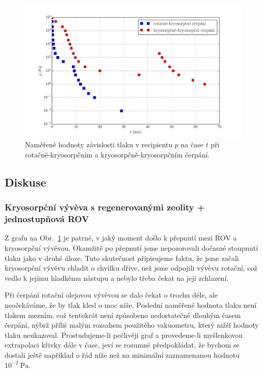 \documentclass[english]{article}
\newcommand{\unit}[1]{~\mathrm{#1}}
\begin{document}
	\begin{figure}[h!]
		\begin{center}
			\includegraphics[width=\linewidth]{../plt/01_kryorot.pdf}
			\vspace*{-0,7cm}
			\caption{Naměřené hodnoty závislosti tlaku v recipientu $p$ na čase $t$ při rotačně-kryosorpčním a kryosorpčně-kryosorpčním čerpání. }
			\label{fig:g_tlak}
		\end{center}
	\end{figure}
			
\subsection{Diskuse}
	\subsubsection{Kryosorpční vývěva s regenerovanými zeolity + jednostupňová ROV}
		Z grafu na Obr.~\ref{fig:g_tlak} je patrné, v jaký moment došlo k přepnutí mezi ROV a kryosorpční vývěvou. Okamžitě po přepnutí jsme nepozorovali dočasné stoupnutí tlaku jako v druhé úloze. Tuto skutečnost připisujeme faktu, že jsme začali kryosorpční vývěvu chladit o chvilku dříve, než jsme odpojili vývěvu rotační, což vedlo k jejímu hladkému nástupu a nebylo třeba čekat na její zchlazení.
		
		Při čerpání rotační olejovou vývěvou se dalo čekat o trochu déle, ale neočekáváme, že by tlak klesl o moc níže. Poslední naměřené hodnota tlaku není tlakem mezním, což tentokrát není způsobeno nedostatečně dlouhým časem čerpání, nýbrž příliš malým rozsahem použitého vakuometru, který nižší hodnoty tlaku neukazoval. Prostudujeme-li pečlivěji graf a provedeme-li myšlenkovou extrapolaci křivky dále v čase, jeví se rozumné předpokládat, že bychom se dostali ještě například o řád níže než na minimální zaznamenanou hodnotu $10^{-2}\unit{Pa}$.
		
\end{document}
